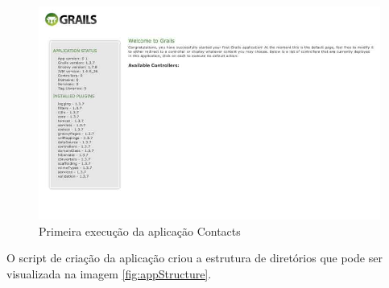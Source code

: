 \documentclass[12pt]{article}
\begin{document}
    \begin{figure}[h!]
    \centering
    \includegraphics[width=1\textwidth]{images/firstRun.jpg}
    \caption{Primeira execução da aplicação Contacts}
    \label{fig:firstRun}
    \end{figure}
    
    O script de criação da aplicação criou a estrutura de diretórios que pode ser
    visualizada na imagem \ref{fig:appStructure}.
    
\end{document}
